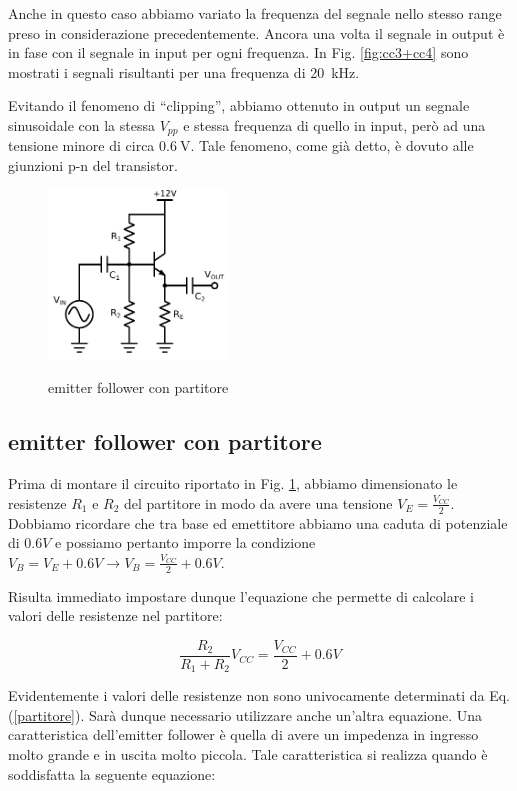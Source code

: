 Anche in questo caso abbiamo variato la frequenza del segnale nello stesso range preso in considerazione precedentemente.
Ancora una volta il segnale in output è in fase con il segnale in input per ogni frequenza.
In Fig. \ref{fig:cc3+cc4} sono mostrati i segnali risultanti per una frequenza di \SI{20}{\kilo\hertz}.

Evitando il fenomeno di ``clipping'', abbiamo ottenuto in output un segnale sinusoidale con la stessa $V_{pp}$ e stessa frequenza di quello in input, però ad una tensione minore di circa $\SI{0.6}{\volt}$. Tale fenomeno, come già detto, è dovuto alle giunzioni p-n del transistor.

\begin{figure}
	\caption{emitter follower con partitore}
	\includegraphics[height=45mm]{cc5.pdf}
	\label{fig:cc5}
\end{figure}

\subsection{emitter follower con partitore}

Prima di montare il circuito riportato in Fig. \ref{fig:cc5}, abbiamo dimensionato le resistenze $R_1$ e $R_2$ del partitore in modo da avere una tensione $V_E=\frac{V_{CC}}{2}$.
Dobbiamo ricordare che tra base ed emettitore abbiamo una caduta di potenziale di $0.6V$ e possiamo pertanto imporre la condizione $V_B=V_E + 0.6V \rightarrow V_B=\frac{V_{CC}}{2} + 0.6V $.

Risulta immediato impostare dunque l'equazione che permette di calcolare i valori delle resistenze nel partitore:

\begin{equation}
\frac{R_2}{R_1+R_2} V_{CC}=\frac{V_{CC}}{2} + 0.6V
\label{partitore}
\end{equation}

Evidentemente i valori delle resistenze non sono univocamente determinati da Eq.(\ref{partitore}).
Sarà dunque necessario utilizzare anche un'altra equazione.
Una caratteristica dell'emitter follower è quella di avere un impedenza in ingresso molto grande e in uscita molto piccola.
Tale caratteristica si realizza quando è soddisfatta la seguente equazione:


